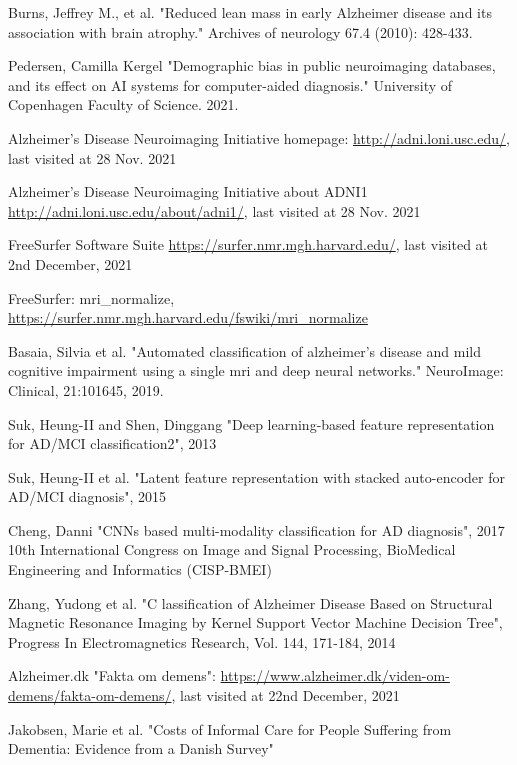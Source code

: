 \documentclass[12pt, fleqn, titlepage]{article}
\newcommand{\1}[1]{\mathds{1}\left[#1\right]}
\begin{document}
\begin{thebibliography}{9}
		 Burns, Jeffrey M., et al. "Reduced lean mass in early Alzheimer disease and its association with brain atrophy." Archives of neurology 67.4 (2010): 428-433.
		
		 Pedersen, Camilla Kergel "Demographic bias in public neuroimaging databases, and its effect on AI systems for computer-aided diagnosis." University of Copenhagen Faculty of Science. 2021.
		
		  Alzheimer’s
		Disease Neuroimaging Initiative homepage: \url{http://adni.loni.usc.edu/}, last visited at 
		28 Nov. 2021
		
		 Alzheimer’s
		Disease Neuroimaging Initiative about ADNI1 \url{http://adni.loni.usc.edu/about/adni1/}, last visited at 28 Nov. 2021
		
		 FreeSurfer Software Suite \url{https://surfer.nmr.mgh.harvard.edu/}, last visited at 2nd December, 2021
		
		 FreeSurfer: mri\_normalize, \url{https://surfer.nmr.mgh.harvard.edu/fswiki/mri_normalize}
		
		 Basaia, Silvia et al. "Automated classification of alzheimer’s disease and mild cognitive impairment using a
		single mri and deep neural networks." NeuroImage: Clinical, 21:101645, 2019.
		
		 Suk, Heung-II and Shen, Dinggang
		 "Deep learning-based feature representation for AD/MCI classification2", 2013
		 
		  Suk, Heung-II et al. "Latent feature representation with stacked auto-encoder for AD/MCI diagnosis", 2015
		
		 Cheng, Danni "CNNs based multi-modality classification for AD diagnosis", 2017 10th International Congress on Image and Signal Processing, BioMedical Engineering and Informatics (CISP-BMEI) 
		
		 Zhang, Yudong et al. "C	lassification of Alzheimer Disease Based on Structural Magnetic
		Resonance Imaging by Kernel Support Vector Machine Decision Tree", Progress In Electromagnetics Research, Vol. 144, 171-184, 2014
		
		 Alzheimer.dk "Fakta om demens": \url{https://www.alzheimer.dk/viden-om-demens/fakta-om-demens/}, last visited at 22nd December, 2021
		
		 Jakobsen, Marie et al. "Costs of Informal Care for People Suffering from Dementia: Evidence from a Danish Survey"
		

\end{thebibliography}
\end{document}
